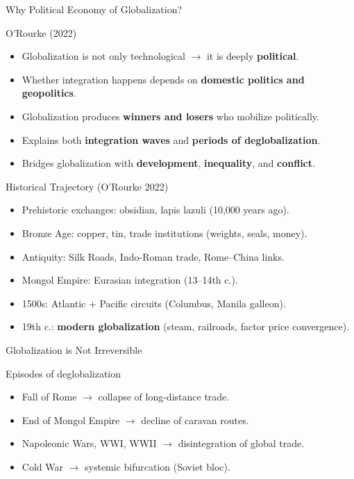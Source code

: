 \documentclass[10pt]{beamer}
\begin{document}
\begin{frame}{Why Political Economy of Globalization?}
\begin{block}{O’Rourke (2022)}
\begin{itemize}
    \item Globalization is not only technological $\rightarrow$ it is deeply 
\textbf{political}.
    \item Whether integration happens depends on \textbf{domestic politics and geopolitics}.
    \item Globalization produces \textbf{winners and losers} who mobilize politically.
\end{itemize}
\end{block}
\pause
\begin{itemize}
    \item Explains both \textbf{integration waves} and \textbf{periods of deglobalization}.
    \item Bridges globalization with \textbf{development}, \textbf{inequality}, and 
\textbf{conflict}.
\end{itemize}
\end{frame}

\begin{frame}{Historical Trajectory (O’Rourke 2022)}
\begin{itemize}
    \item Prehistoric exchanges: obsidian, lapis lazuli (10,000 years ago).
    \item Bronze Age: copper, tin, trade institutions (weights, seals, money).
    \item Antiquity: Silk Roads, Indo-Roman trade, Rome–China links.
    \item Mongol Empire: Eurasian integration (13--14th c.).
    \item 1500s: Atlantic + Pacific circuits (Columbus, Manila galleon).
    \item 19th c.: \textbf{modern globalization} (steam, railroads, factor price convergence).
\end{itemize}
\end{frame}

\begin{frame}{Globalization is Not Irreversible}
\begin{block}{Episodes of deglobalization}
\begin{itemize}
    \item Fall of Rome $\rightarrow$ collapse of long-distance trade.
    \item End of Mongol Empire $\rightarrow$ decline of caravan routes.
    \item Napoleonic Wars, WWI, WWII $\rightarrow$ disintegration of global trade.
    \item Cold War $\rightarrow$ systemic bifurcation (Soviet bloc).
\end{itemize}
\end{block}
\end{frame}
\end{document}

